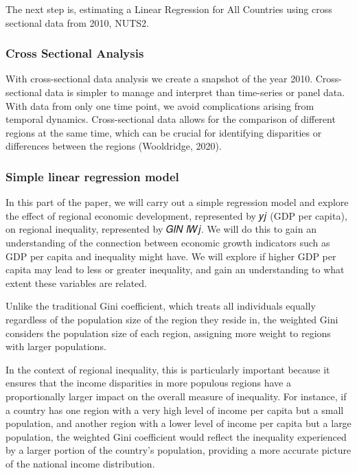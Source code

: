 \documentclass[
  a4paper,
  DIV=11,
  numbers=noendperiod]{scrartcl}
\begin{document}
The next step is, estimating a Linear Regression for All Countries using
cross sectional data from 2010, NUTS2.

\hypertarget{cross-sectional-analysis-1}{%
\subsubsection{\texorpdfstring{\textbf{Cross Sectional
Analysis}}{Cross Sectional Analysis}}\label{cross-sectional-analysis-1}}

With cross-sectional data analysis we create a snapshot of the year
2010. Cross-sectional data is simpler to manage and interpret than
time-series or panel data. With data from only one time point, we avoid
complications arising from temporal dynamics. Cross-sectional data
allows for the comparison of different regions at the same time, which
can be crucial for identifying disparities or differences between the
regions (Wooldridge, 2020).

\hypertarget{simple-linear-regression-model}{%
\subsubsection{\texorpdfstring{\textbf{Simple linear regression
model}}{Simple linear regression model}}\label{simple-linear-regression-model}}

In this part of the paper, we will carry out a simple regression model
and explore the effect of regional economic development, represented by
𝑦𝑗 (GDP per capita), on regional inequality, represented by 𝐺𝐼𝑁 𝐼𝑊𝑗. We
will do this to gain an understanding of the connection between economic
growth indicators such as GDP per capita and inequality might have. We
will explore if higher GDP per capita may lead to less or greater
inequality, and gain an understanding to what extent these variables are
related.

Unlike the traditional Gini coefficient, which treats all individuals
equally regardless of the population size of the region they reside in,
the weighted Gini considers the population size of each region,
assigning more weight to regions with larger populations.

In the context of regional inequality, this is particularly important
because it ensures that the income disparities in more populous regions
have a proportionally larger impact on the overall measure of
inequality. For instance, if a country has one region with a very high
level of income per capita but a small population, and another region
with a lower level of income per capita but a large population, the
weighted Gini coefficient would reflect the inequality experienced by a
larger portion of the country's population, providing a more accurate
picture of the national income distribution.
\end{document}

